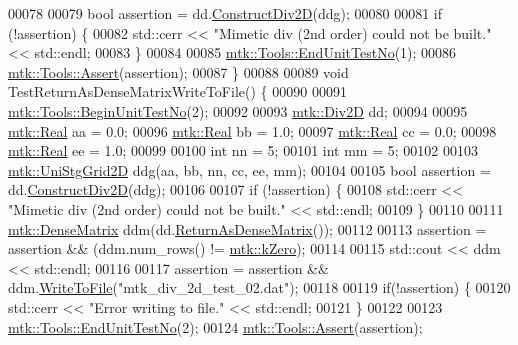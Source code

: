 \begin{DoxyCode}
00078 
00079   \textcolor{keywordtype}{bool} assertion = dd.\hyperlink{classmtk_1_1Div2D_a4214055909a6b94fcb9d657cc839055f}{ConstructDiv2D}(ddg);
00080 
00081   \textcolor{keywordflow}{if} (!assertion) \{
00082     std::cerr << \textcolor{stringliteral}{"Mimetic div (2nd order) could not be built."} << std::endl;
00083   \}
00084 
00085   \hyperlink{classmtk_1_1Tools_ad8cf0085133dd40c913fe195bc5b9694}{mtk::Tools::EndUnitTestNo}(1);
00086   \hyperlink{classmtk_1_1Tools_aa311fada9255627d06c56b1e4fedce9e}{mtk::Tools::Assert}(assertion);
00087 \}
00088 
00089 \textcolor{keywordtype}{void} TestReturnAsDenseMatrixWriteToFile() \{
00090 
00091   \hyperlink{classmtk_1_1Tools_a26ee906d28523378522a75e25c3a4e19}{mtk::Tools::BeginUnitTestNo}(2);
00092 
00093   \hyperlink{classmtk_1_1Div2D}{mtk::Div2D} dd;
00094 
00095   \hyperlink{group__c01-roots_gac080bbbf5cbb5502c9f00405f894857d}{mtk::Real} aa = 0.0;
00096   \hyperlink{group__c01-roots_gac080bbbf5cbb5502c9f00405f894857d}{mtk::Real} bb = 1.0;
00097   \hyperlink{group__c01-roots_gac080bbbf5cbb5502c9f00405f894857d}{mtk::Real} cc = 0.0;
00098   \hyperlink{group__c01-roots_gac080bbbf5cbb5502c9f00405f894857d}{mtk::Real} ee = 1.0;
00099 
00100   \textcolor{keywordtype}{int} nn = 5;
00101   \textcolor{keywordtype}{int} mm = 5;
00102 
00103   \hyperlink{classmtk_1_1UniStgGrid2D}{mtk::UniStgGrid2D} ddg(aa, bb, nn, cc, ee, mm);
00104 
00105   \textcolor{keywordtype}{bool} assertion = dd.\hyperlink{classmtk_1_1Div2D_a4214055909a6b94fcb9d657cc839055f}{ConstructDiv2D}(ddg);
00106 
00107   \textcolor{keywordflow}{if} (!assertion) \{
00108     std::cerr << \textcolor{stringliteral}{"Mimetic div (2nd order) could not be built."} << std::endl;
00109   \}
00110 
00111   \hyperlink{classmtk_1_1DenseMatrix}{mtk::DenseMatrix} ddm(dd.\hyperlink{classmtk_1_1Div2D_ae27437bb5ebb5552a786e501e4dcf51e}{ReturnAsDenseMatrix}());
00112 
00113   assertion = assertion && (ddm.num\_rows() != \hyperlink{group__c01-roots_ga59a451a5fae30d59649bcda274fea271}{mtk::kZero});
00114 
00115   std::cout << ddm << std::endl;
00116 
00117   assertion = assertion && ddm.\hyperlink{classmtk_1_1DenseMatrix_aedead04ae21c5d66428b84da3dac943a}{WriteToFile}(\textcolor{stringliteral}{"mtk\_div\_2d\_test\_02.dat"});
00118 
00119   \textcolor{keywordflow}{if}(!assertion) \{
00120     std::cerr << \textcolor{stringliteral}{"Error writing to file."} << std::endl;
00121   \}
00122 
00123   \hyperlink{classmtk_1_1Tools_ad8cf0085133dd40c913fe195bc5b9694}{mtk::Tools::EndUnitTestNo}(2);
00124   \hyperlink{classmtk_1_1Tools_aa311fada9255627d06c56b1e4fedce9e}{mtk::Tools::Assert}(assertion);

\end{DoxyCode}
